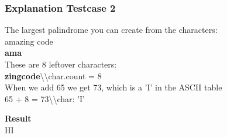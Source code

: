 \subsubsection{Explanation Testcase 2}
The largest palindrome you can create from the characters:\\
amazing code\\
\quad \textbf{ama}\\
These are 8 leftover characters:\\
\quad \textbf{zingcode}\quad\quad\quad\quad\quad\quad\textbackslash\textbackslash char.count = 8\\
When we add 65 we get 73, which is a 'I' in the ASCII table\\
65 + 8 = 73\quad\quad\quad\quad\quad\textbackslash\textbackslash char: 'I'

\textbf{Result}\\
HI
